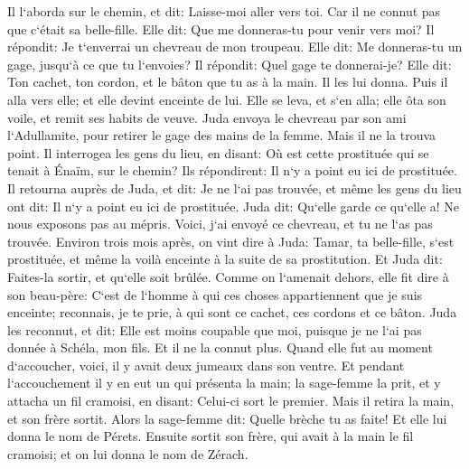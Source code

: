 \verse Il l`aborda sur le chemin, et dit: Laisse-moi aller vers toi. Car il ne connut pas que c`était sa belle-fille. Elle dit: Que me donneras-tu pour venir vers moi? 
\verse Il répondit: Je t`enverrai un chevreau de mon troupeau. Elle dit: Me donneras-tu un gage, jusqu`à ce que tu l`envoies? 
\verse Il répondit: Quel gage te donnerai-je? Elle dit: Ton cachet, ton cordon, et le bâton que tu as à la main. Il les lui donna. Puis il alla vers elle; et elle devint enceinte de lui. 
\verse Elle se leva, et s`en alla; elle ôta son voile, et remit ses habits de veuve. 
\verse Juda envoya le chevreau par son ami l`Adullamite, pour retirer le gage des mains de la femme. Mais il ne la trouva point. 
\verse Il interrogea les gens du lieu, en disant: Où est cette prostituée qui se tenait à Énaïm, sur le chemin? Ils répondirent: Il n`y a point eu ici de prostituée. 
\verse Il retourna auprès de Juda, et dit: Je ne l`ai pas trouvée, et même les gens du lieu ont dit: Il n`y a point eu ici de prostituée. 
\verse Juda dit: Qu`elle garde ce qu`elle a! Ne nous exposons pas au mépris. Voici, j`ai envoyé ce chevreau, et tu ne l`as pas trouvée. 
\verse Environ trois mois après, on vint dire à Juda: Tamar, ta belle-fille, s`est prostituée, et même la voilà enceinte à la suite de sa prostitution. Et Juda dit: Faites-la sortir, et qu`elle soit brûlée. 
\verse Comme on l`amenait dehors, elle fit dire à son beau-père: C`est de l`homme à qui ces choses appartiennent que je suis enceinte; reconnais, je te prie, à qui sont ce cachet, ces cordons et ce bâton. 
\verse Juda les reconnut, et dit: Elle est moins coupable que moi, puisque je ne l`ai pas donnée à Schéla, mon fils. Et il ne la connut plus. 
\verse Quand elle fut au moment d`accoucher, voici, il y avait deux jumeaux dans son ventre. 
\verse Et pendant l`accouchement il y en eut un qui présenta la main; la sage-femme la prit, et y attacha un fil cramoisi, en disant: Celui-ci sort le premier. 
\verse Mais il retira la main, et son frère sortit. Alors la sage-femme dit: Quelle brèche tu as faite! Et elle lui donna le nom de Pérets. 
\verse Ensuite sortit son frère, qui avait à la main le fil cramoisi; et on lui donna le nom de Zérach. 

